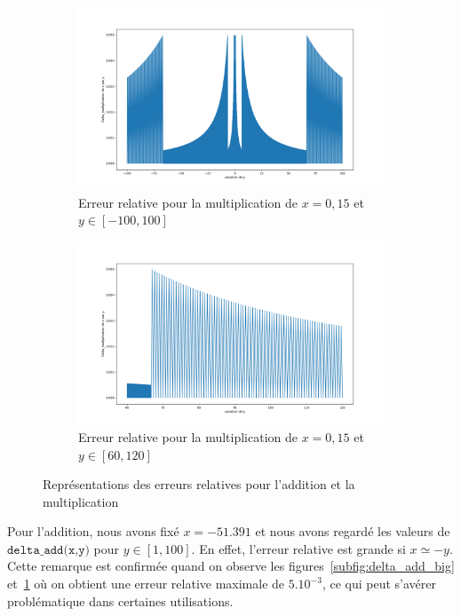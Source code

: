 \documentclass{article}
\begin{document}
\begin{figure}[ht]
\begin{subfigure}[b]{0.5\textwidth}
    \label{subfig:delta_add_zoom}
  \end{subfigure}
  \begin{subfigure}[b]{0.5\textwidth}
    \centering
      \includegraphics[width=\linewidth]{Partie1-delta_mult_100-100.png}
      \caption{Erreur relative pour la multiplication de $x = 0,15$ et $y\in[-100,100]$}
      \label{subfig:delta_multi_big}
  \end{subfigure}
  \begin{subfigure}[b]{0.5\textwidth}
    \centering
    \includegraphics[width=\linewidth]{Partie1-delta_mult_60-120.png}
    \caption{Erreur relative pour la multiplication de $x = 0,15$ et $y\in[60,120]$}
    \label{subfig:delta_mult_zoom}
    \end{subfigure}
  \caption{Représentations des erreurs relatives pour l'addition et la multiplication}
  \label{fig:relative_error}
\end{figure}

Pour l'addition, nous avons fixé $x = -51.391$ et nous avons regardé les valeurs de $\texttt{delta\_add(x,y)}$ pour $y\in[1,100]$. En effet, l’erreur relative est grande si $x\simeq -y$. Cette remarque est confirmée quand on observe les figures~\ref{subfig:delta_add_big} et~\ref{subfig:delta_add_zoom} où on obtient une erreur relative maximale de $5.10^{-3}$, ce qui peut s'avérer problématique dans certaines utilisations.
\end{document}

